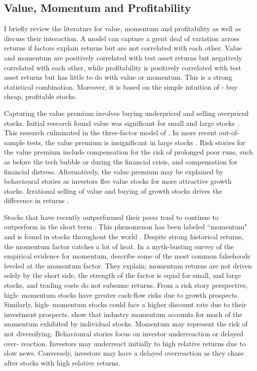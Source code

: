 
\subsection{Value, Momentum and Profitability}

I briefly review the literature for value, momentum and profitability as well as discuss
their interaction. A model can capture a great deal of variation across returns if factors
explain returns but are not correlated with each other. Value and momentum are positively
correlated with test asset returns but negatively correlated with each other, while
profitability is positively correlated with test asset returns but has little to do with
value or momentum. This is a strong statistical combination. Moreover, it is based on the
simple intuition of \textcite{graham1934security} - buy cheap, profitable stocks.

Capturing the value premium involves buying underpriced and selling overpriced stocks.
Initial research found value was significant for small and large stocks
\parencite{fama1992cross}. This research culminated in the three-factor model of
\textcite{fama1993common}. In more recent out-of-sample tests, the value premium is
insignificant in large stocks \parencite{asness2015fact}. Risk stories for the value
premium include compensation for the risk of prolonged poor runs, such as before the tech
bubble or during the financial crisis, and compensation for financial distress.
Alternatively, the value premium may be explained by behavioural stories as investors flee
value stocks for more attractive growth stocks. Irrational selling of value and buying of
growth stocks drives the difference in returns \parencite{bondt1985does}.

Stocks that have recently outperformed their peers tend to continue to outperform in the
short term \parencite{jegadeesh1993returns}. This phenomenon has been labeled ``momentum"
and is found in stocks throughout the world \parencite{asness2013value}. Despite strong
historical returns, the momentum factor catches a lot of heat. In a myth-busting survey of
the empirical evidence for momentum, \textcite{asness2014fact} describe some of the most
common falsehoods leveled at the momentum factor. They explain; momentum returns are not
driven solely by the short side, the strength of the factor is equal for small, and large
stocks, and trading costs do not subsume returns. From a risk story perspective, high-
momentum stocks have greater cash-flow risks due to growth prospects. Similarly, high-
momentum stocks could face a higher discount rate due to their investment prospects.
\textcite{moskowitz1999industries} show that industry momentum accounts for much of the
momentum exhibited by individual stocks. Momentum may represent the risk of not
diversifying. Behavioural stories focus on investor underreaction or delayed over-
reaction. Investors may underreact initially to high relative returns due to slow news.
Conversely, investors may have a delayed overreaction as they chase after stocks with high
relative returns.


